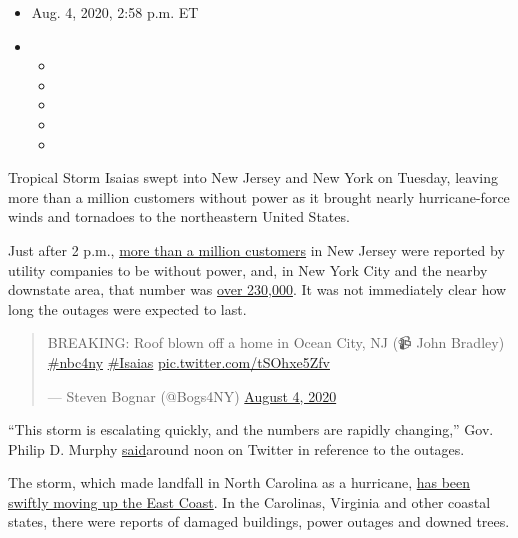 \begin{itemize}
\item
  Aug. 4, 2020, 2:58 p.m. ET
\item
  \begin{itemize}
  \item
  \item
  \item
  \item
  \item
  \end{itemize}
\end{itemize}

Tropical Storm Isaias swept into New Jersey and New York on Tuesday,
leaving more than a million customers without power as it brought nearly
hurricane-force winds and tornadoes to the northeastern United States.

Just after 2 p.m.,
\href{https://poweroutage.us/area/state/new\%20jersey}{more than a
million customers} in New Jersey were reported by utility companies to
be without power, and, in New York City and the nearby downstate area,
that number was
\href{https://poweroutage.us/area/state/new\%20york}{over 230,000}. It
was not immediately clear how long the outages were expected to last.

\begin{quote}
BREAKING: Roof blown off a home in Ocean City, NJ (📹 John Bradley)
\href{https://twitter.com/hashtag/nbc4ny?src=hash\&ref_src=twsrc\%5Etfw}{\#nbc4ny}
\href{https://twitter.com/hashtag/Isaias?src=hash\&ref_src=twsrc\%5Etfw}{\#Isaias}
\href{https://t.co/tSOhxe5Zfv}{pic.twitter.com/tSOhxe5Zfv}

--- Steven Bognar (@Bogs4NY)
\href{https://twitter.com/Bogs4NY/status/1290669802198114309?ref_src=twsrc\%5Etfw}{August
4, 2020}
\end{quote}

``This storm is escalating quickly, and the numbers are rapidly
changing,'' Gov. Philip D. Murphy
\href{https://twitter.com/GovMurphy/status/1290684560326512650}{said}around
noon on Twitter in reference to the outages.

The storm, which made landfall in North Carolina as a hurricane,
\href{https://www.nytimes3xbfgragh.onion/2020/08/04/us/isaias-storm-updates.html?action=click\&module=Top\%20Stories\&pgtype=Homepage\#link-34e5d4e4}{has
been swiftly moving up the East Coast}. In the Carolinas, Virginia and
other coastal states, there were reports of damaged buildings, power
outages and downed trees.

